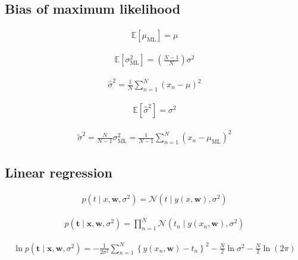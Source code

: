 \documentclass{article}
\begin{document}
\subsection{Bias of maximum likelihood}

\begin{align*}
\mathbb{E}\left[ \mu_{\mathrm{ML}} \right] = \mu
\tag{2.59}
\end{align*}

\begin{align*}
\mathbb{E}\left[ \sigma_{\mathrm{ML}}^{2} \right] = \left( \frac{N - 1}{N} \right) \sigma^{2}
\tag{2.60}
\end{align*}

\begin{align*}
\widehat{\sigma}^{2} = \frac{1}{N} \sum_{n=1}^{N} \left( x_n - \mu \right)^2
\tag{2.61}
\end{align*}

\begin{align*}
\mathbb{E}\left[ \widehat{\sigma}^{2} \right] = \sigma^{2}
\tag{2.62}
\end{align*}

\begin{align*}
\widetilde{\sigma}^{2} = \frac{N}{N - 1} \sigma_{\mathrm{ML}}^{2} = \frac{1}{N - 1} \sum_{n=1}^{N} \left( x_n - \mu_{\mathrm{ML}} \right)^2
\tag{2.63}
\end{align*}

\subsection{Linear regression}

\begin{align*}
p\left(t \mid x, \mathbf{w}, \sigma^{2}\right) = \mathcal{N}\left( t \mid y(x, \mathbf{w}), \sigma^{2} \right)
\tag{2.64}
\end{align*}

\begin{align*}
p\left( \mathbf{t} \mid \mathbf{x}, \mathbf{w}, \sigma^{2} \right) = \prod_{n=1}^{N} \mathcal{N}\left( t_n \mid y(x_n, \mathbf{w}), \sigma^{2} \right)
\tag{2.65}
\end{align*}

\begin{align*}
\ln p\left( \mathbf{t} \mid \mathbf{x}, \mathbf{w}, \sigma^{2} \right) = -\frac{1}{2 \sigma^{2}} \sum_{n=1}^{N} \left\{ y(x_n, \mathbf{w}) - t_n \right\}^{2} - \frac{N}{2} \ln \sigma^{2} - \frac{N}{2} \ln (2 \pi)
\tag{2.66}
\end{align*}
\end{document}
